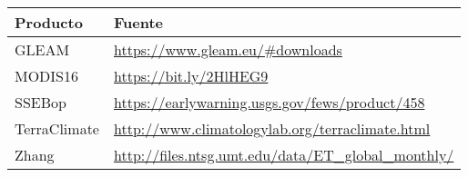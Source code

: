 \begin{table}[htb]
\label{tab:Table_AE_products_source}
\centering
\begin{tabular}{ll}
\hline
Producto     & Fuente                                                                     \\ \hline
GLEAM        & \url{https://www.gleam.eu/#downloads}                   \\
MODIS16      & \url{https://bit.ly/2HlHEG9}  \\
SSEBop       & \url{https://earlywarning.usgs.gov/fews/product/458}      \\
TerraClimate & \url{http://www.climatologylab.org/terraclimate.html}     \\
Zhang        & \url{http://files.ntsg.umt.edu/data/ET_global_monthly/} \\
\hline
\end{tabular}
\end{table}